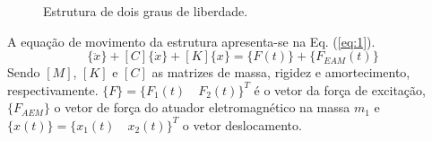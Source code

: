 \documentclass[journal, twoside]{IEEEtran}
\begin{document}
\begin{figure}[!t]
\centering
{}
\hfil
{}
\caption{Estrutura de dois graus de liberdade.}
\label{fig:est}
\end{figure}

A equação de movimento da estrutura apresenta-se na Eq. (\ref{eq:1}).
\begin{equation}
	[M]\{\ddot{x} \}+[C]\{\dot{x} \}+[K]\{x \} = \{F(t) \} +\{F_{EAM}(t) \}
	\label{eq:1}
\end{equation}
Sendo $[M]$, $[K]$ e $[C]$ as matrizes de massa, rigidez e amortecimento, respectivamente. $\{F\}=\{F_1(t) \quad F_2(t)\}^T$ é o vetor da força de excitação, $\{F_{AEM}\}$ o vetor de força do atuador eletromagnético na massa $m_1$ e $\{x(t)\}=\{x_1(t) \quad x_2(t)\}^T$ o vetor deslocamento.
\end{document}
